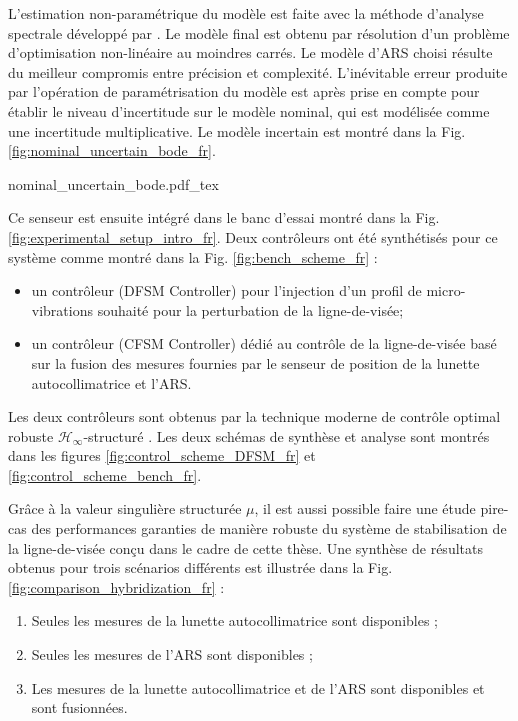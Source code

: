 L’estimation non-paramétrique du modèle est faite avec la méthode d’analyse spectrale développé par \cite{ljung1987system}. Le modèle final est obtenu par résolution d’un problème d’optimisation non-linéaire au moindres carrés. Le modèle d’ARS choisi résulte du meilleur compromis entre précision et complexité. L’inévitable erreur produite par l’opération de paramétrisation du modèle est après prise en compte pour établir le niveau d’incertitude sur le modèle nominal, qui est modélisée comme une incertitude multiplicative. Le modèle incertain est montré dans la Fig. \ref{fig:nominal_uncertain_bode_fr}.

\begin{figure*}
    \centering
        \def\svgwidth{0.5\textwidth}
    {
    {nominal_uncertain_bode.pdf_tex}
    }
   \caption{Réponse en fréquence du modèle nominal idéntifié de l'ARS-14 et du modèle incertain due à l'erreur de paramétrisation.}
         \label{fig:nominal_uncertain_bode_fr}
\end{figure*}

Ce senseur est ensuite intégré dans le banc d’essai montré dans la Fig. \ref{fig:experimental_setup_intro_fr}. Deux contrôleurs ont été synthétisés pour ce système comme montré dans la Fig. \ref{fig:bench_scheme_fr} :
\begin{itemize}
\item un contrôleur (DFSM Controller) pour l’injection d’un profil de micro-vibrations souhaité pour la perturbation de la ligne-de-visée;
\item un contrôleur (CFSM Controller) dédié au contrôle de la ligne-de-visée basé sur la fusion des mesures fournies par le senseur de position de la lunette autocollimatrice et l’ARS.
\end{itemize}

Les deux contrôleurs sont obtenus par la technique moderne de contrôle optimal robuste $\mathcal{H}_\infty$-structuré \cite{apkarian2011,apkarian2015}. 
Les deux schémas de synthèse et analyse sont montrés dans les figures \ref{fig:control_scheme_DFSM_fr} et \ref{fig:control_scheme_bench_fr}.

Grâce à la valeur singulière structurée $\mu$, il est aussi possible faire une étude pire-cas des performances garanties de manière robuste du système de stabilisation de la ligne-de-visée conçu dans le cadre de cette thèse. Une synthèse de résultats obtenus pour trois scénarios différents est illustrée dans la Fig. \ref{fig:comparison_hybridization_fr} :
\begin{enumerate}
\item Seules les mesures de la lunette autocollimatrice sont disponibles ;
\item Seules les mesures de l’ARS sont disponibles ;
\item Les mesures de la lunette autocollimatrice et de l’ARS sont disponibles et sont fusionnées.
\end{enumerate}

